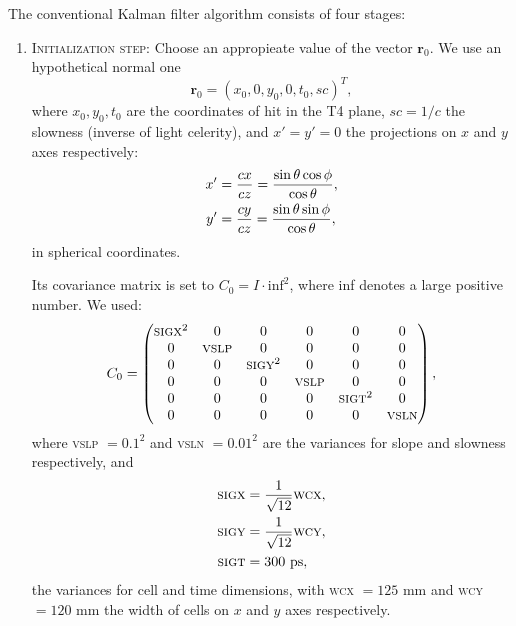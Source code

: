 \documentclass[a4paper]{book}
\let\vec\mathbf  %
\begin{document}
The conventional Kalman filter algorithm consists of four stages:
\begin{enumerate}
	\item \textsc{Initialization step:} Choose an appropieate value of the vector $\vec{r}_0$. We use an hypothetical normal one
	\begin{equation}
	\vec{r}_0 = (x_0, 0, y_0, 0, t_0, sc)^T,
	\label{eq:ro}
	\end{equation}
	where $x_0, y_0, t_0$ are the coordinates of hit in the T4 plane, $sc = 1/c$ the slowness (inverse of light celerity), and $x' = y' = 0$ the projections on $x$ and $y$ axes respectively:
	\begin{align}
	\notag
	x' &= \frac{cx}{cz} = \frac{\sin\theta \cos \phi}{\cos \theta},\\
	y' &= \frac{cy}{cz} = \frac{\sin\theta \sin \phi}{\cos \theta},
	\label{eq:xpyp}
	\end{align}
	in spherical coordinates.
	
	Its covariance matrix is set to $C_0 = I \cdot \mathrm{inf}^2$, where inf denotes a large positive number. We used:
	\begin{equation}
	C_0 = 
	\left(
	\begin{matrix}
	\mathrm{\textsc{sigx}}^2 & 0           & 0               & 0           & 0               & 0      \\
	0             & \mathrm{\textsc{vslp}} & 0               & 0           & 0               & 0       \\
	0             & 0             & \mathrm{\textsc{sigy}}^2 & 0           & 0               & 0        \\
	0             & 0             & 0             & \mathrm{\textsc{vslp}} & 0               & 0         \\
	0             & 0             & 0             & 0             & \mathrm{\textsc{sigt}}^2 & 0          \\
	0             & 0             & 0             & 0             & 0             & \mathrm{\textsc{vsln}} \\
	\end{matrix}\right),
	\end{equation}
	where \textsc{vslp} $= 0.1^2$ and \textsc{vsln} $= 0.01^2$ are the variances for slope and slowness respectively, and
	\begin{align}
	\notag
	\mathrm{\textsc{sigx}} &= \frac{1}{\sqrt{12}} \mathrm{\textsc{wcx}},\\ \notag
	\mathrm{\textsc{sigy}} &= \frac{1}{\sqrt{12}} \mathrm{\textsc{wcy}},\\
	\mathrm{\textsc{sigt}} &= 300\ \mathrm{ps},
	\label{eq:sig}
	\end{align}
	the variances for cell and time dimensions, with \textsc{wcx} $= 125$ mm and \textsc{wcy} $= 120$ mm the width of cells on $x$ and $y$ axes respectively.
	

\end{enumerate}
\end{document}
